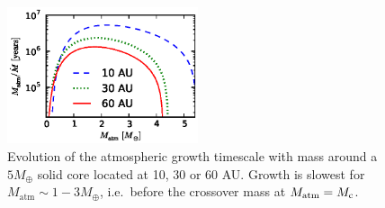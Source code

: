 \documentclass[apj, numberedappendix]{emulateapj}
\newcommand{\Figs}[2]{Figs.~\ref{#1} and \ref{#2}}
\newcommand{\co}{_{\rm c}}
\begin{document}







\begin{figure}[tb]
\centering
\includegraphics[width=0.5\textwidth]{../../figs/ModelAtmospheres/RadSelfGravPoly/PaperFigs/Mt_profile_temp.eps}
\caption{Evolution of the atmospheric growth timescale with mass around a $5 M_{\oplus}$ solid core  located at 10, 30 or 60 AU.  Growth is slowest for $M_{\mathrm{atm}} \sim 1 - 3 M_{\oplus}$, i.e.\ before the crossover mass at $M_{\rm atm} = M\co$.}
\label{fig:growthtime}
\end{figure}
\end{document}
